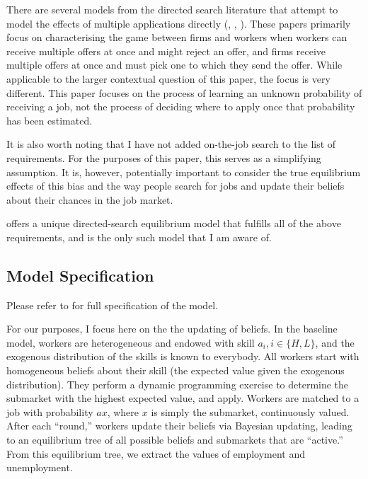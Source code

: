 \documentclass[a4paper,12pt]{article}
\begin{document}
There are several models from the directed search literature that attempt to model the effects of multiple applications directly (\cite{albrecht2006}, \cite{galenianos2009}, \cite{wolthoff2017}). These papers primarily focus on characterising the game between firms and workers when workers can receive multiple offers at once and might reject an offer, and firms receive multiple offers at once and must pick one to which they send the offer. While applicable to the larger contextual question of this paper, the focus is very different. This paper focuses on the process of learning an unknown probability of receiving a job, not the process of deciding where to apply once that probability has been estimated.

It is also worth noting that I have not added on-the-job search to the list of requirements. For the purposes of this paper, this serves as a simplifying assumption. It is, however, potentially important to consider the true equilibrium effects of this bias and the way people search for jobs and update their beliefs about their chances in the job market.

\cite{gonzalez2010} offers a unique directed-search equilibrium model that fulfills all of the above requirements, and is the only such model that I am aware of.

\subsection{ Model Specification }

Please refer to \cite{gonzalez2010} for full specification of the model.

For our purposes, I focus here on the the updating of beliefs. In the baseline model, workers are heterogeneous and endowed with skill $a_i, i \in \{ H, L \}$, and the exogenous distribution of the skills is known to everybody. All workers start with homogeneous beliefs about their skill (the expected value given the exogenous distribution). They perform a dynamic programming exercise to determine the submarket with the highest expected value, and apply. Workers are matched to a job with probability $ax$, where $x$ is simply the submarket, continuously valued. After each ``round,'' workers update their beliefs via Bayesian updating, leading to an equilibrium tree of all possible beliefs and submarkets that are ``active.'' From this equilibrium tree, we extract the values of employment and unemployment.
\end{document}
